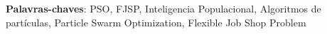\par

\begin{resumo}
    \lipsum[5]
    \vspace{\onelineskip} 
    
    \noindent\textbf{Palavras-chaves}: PSO, FJSP, Inteligencia Populacional, Algoritmos de partículas, Particle Swarm Optimization, Flexible Job Shop Problem
\end{resumo}
